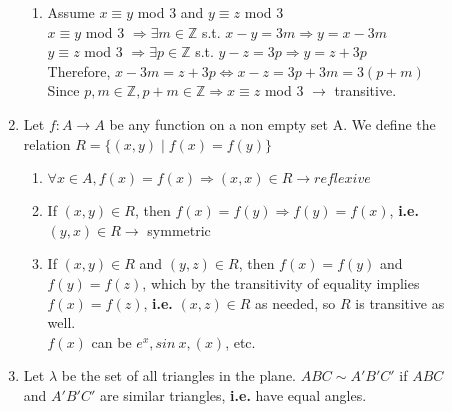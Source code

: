 \documentclass[10pt]{article}
\begin{document}
\begin{description}
\begin{enumerate}
\begin{enumerate}
				\item Assume $x \equiv y$ mod 3 and $y \equiv z$ mod 3 \\
				$x \equiv y$ mod 3 $\Rightarrow \exists m \in \mathbb{Z}$ s.t. $x-y=3m \Rightarrow y=x-3m$ \\
				$y \equiv z$ mod 3 $\Rightarrow \exists p \in \mathbb{Z}$ s.t. $y-z=3p \Rightarrow y=z+3p$ \\
				Therefore, $x-3m=z+3p \Leftrightarrow x-z=3p+3m = 3(p+m)$ \\
				Since $p, m \in \mathbb{Z}, p+m \in \mathbb{Z} \Rightarrow x \equiv z$ mod 3 $\rightarrow$ transitive.
			\end{enumerate}
			\item Let $f:A \rightarrow A$ be any function on a non empty set A. We define the relation $R = \{(x, y) \mid f(x)=f(y) \}$
			\begin{enumerate}
				\item $\forall x \in A, f(x)=f(x) \Rightarrow (x, x) \in R \rightarrow reflexive$
				\item If $(x, y) \in R$, then $f(x)=f(y) \Rightarrow f(y)=f(x)$, \textbf{i.e.} $(y, x) \in R \rightarrow$ symmetric
				\item If $(x, y) \in R$ and $(y, z) \in R$, then $f(x)=f(y)$ and $f(y)=f(z)$, which by the transitivity of equality implies $f(x)=f(z)$, \textbf{i.e.} $(x, z) \in R$ as needed, so $R$ is transitive as well.\\
				$f(x)$ can be $e^x, sin\:x, (x)$, etc.
			\end{enumerate}
			\pagebreak
			\item Let $\lambda$ be the set of all triangles in the plane. $ABC \sim A'B'C'$ if $ABC$ and $A'B'C'$ are similar triangles, \textbf{i.e.} have equal angles.
			
			\begin{figure}[t!]
				\centering
			\end{figure}
			

\end{enumerate}
\end{description}
\end{document}
